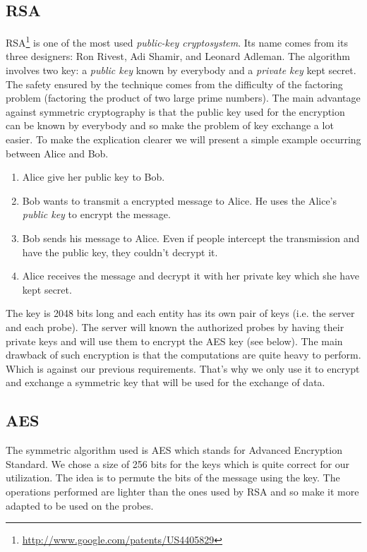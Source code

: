 \subsection{RSA}
RSA\footnote{\url{http://www.google.com/patents/US4405829}} is one of the most used \emph{public-key cryptosystem}. Its name comes from its three designers: Ron Rivest, Adi Shamir, and Leonard Adleman. The algorithm involves two key: a \emph{public key} known by everybody and a \emph{private key} kept secret. The safety ensured by the technique comes from the difficulty of the factoring problem (factoring the product of two large prime numbers).
The main advantage against symmetric cryptography is that the public key used for the encryption can be known by everybody and so make the problem of key exchange a lot easier. To make the explication clearer we will present a simple example occurring between Alice and Bob.
\begin{enumerate}
\item Alice give her public key to Bob.
\item Bob wants to transmit a encrypted message to Alice. He uses the Alice's \emph{public key} to encrypt the message.
\item Bob sends his message to Alice. Even if people intercept the transmission and have the public key, they couldn't decrypt it.
\item Alice receives the message and decrypt it with her private key which she have kept secret.
\end{enumerate}
The key is 2048 bits long and each entity has its own pair of keys (i.e. the server and each probe). The server will known the authorized probes by having their private keys and will use them to encrypt the AES key (see below).
The main drawback of such encryption is that the computations are quite heavy to perform. Which is against our previous requirements. That's why we only use it to encrypt and exchange a symmetric key that will be used for the exchange of data.
\subsection{AES}
The symmetric algorithm used is AES which stands for Advanced Encryption Standard. We chose a size of 256 bits for the keys which is quite correct for our utilization. The idea is to permute the bits of the message using the key. The operations performed are lighter than the ones used by RSA and so make it more adapted to be used on the probes.

